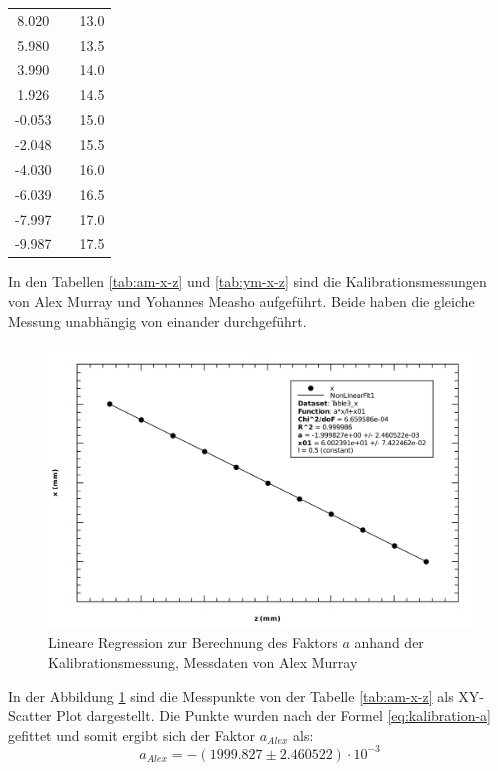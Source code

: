 \begin{table}[H]
\begin{subtable}{.5\linewidth}
\begin{tabular}{ccc}
            8.020  && 13.0 \\
            5.980  && 13.5 \\
            3.990  && 14.0 \\
            1.926  && 14.5 \\
            -0.053 && 15.0 \\
            -2.048 && 15.5 \\
            -4.030 && 16.0 \\
            -6.039 && 16.5 \\
            -7.997 && 17.0 \\
            -9.987 && 17.5 \\
           \bottomrule
        \end{tabular}
    \end{subtable}
\end{table}

In    den   Tabellen   \ref{tab:am-x-z}   und    \ref{tab:ym-x-z}    sind    die
Kalibrationsmessungen von Alex Murray  und  Yohannes  Measho aufgef\"uhrt. Beide
haben   die   gleiche   Messung   unabh\"angig  von   einander   durchgef\"uhrt.

\begin{figure}[H]
    \center
    \includegraphics[width=.8\textwidth]{images/am-x-z-fit-a.pdf}
    \caption{Lineare Regression zur Berechnung des Faktors $a$ anhand der Kalibrationsmessung, Messdaten von Alex Murray}
    \label{fig:am-x-z-fit-a}
\end{figure}

In der Abbildung \ref{fig:am-x-z-fit-a}  sind  die  Messpunkte  von  der Tabelle
\ref{tab:am-x-z} als XY-Scatter Plot dargestellt.  Die  Punkte  wurden  nach der
Formel  \ref{eq:kalibration-a}   gefittet  und  somit  ergibt  sich  der  Faktor
$a_{Alex}$ als:
\begin{equation}
    a_{Alex} = -(1999.827 \pm 2.460522)\cdot 10^{-3}
    \label{eq:am-a}
\end{equation}


